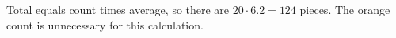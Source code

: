 Total equals count times average, so there are $ 20\cdot6.2=\boxed{124}$ pieces. The orange count is unnecessary for this calculation.
